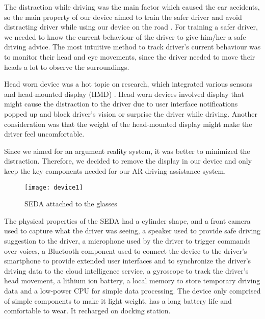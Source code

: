 \documentclass[main.tex]{subfiles}
\begin{document}

The distraction while driving was the main factor which caused the car accidents, so the main property of our device aimed to train the safer driver and avoid distracting driver while using our device on the road \cite{siebe2014distracted}. For training a safer driver, we needed to know the current behaviour of the driver to give him/her a safe driving advice. The most intuitive method to track driver’s current behaviour was to monitor their head and eye movements, since the driver needed to move their heads a lot to observe the surroundings.

Head worn device was a hot topic on research, which integrated various sensors and head-mounted display (HMD) \cite{van2010survey}. Head worn devices involved display that might cause the distraction to the driver due to user interface notifications popped up and block driver’s vision or surprise the driver while driving. Another consideration was that the weight of the head-mounted display might make the driver feel uncomfortable. 

Since we aimed for an argument reality system, it was better to minimized the distraction. Therefore, we decided to remove the display in our device and only keep the key components needed for our AR driving assistance system.

\begin{figure}
\caption{SEDA attached to the glasses}
\centering
\texttt{[image: device1]}
\end{figure}

The physical properties of the SEDA had a cylinder shape, and a front camera used to capture what the driver was seeing, a speaker used to provide safe driving suggestion to the driver, a microphone used by the driver to trigger commands over voices, a Bluetooth component used to connect the device to the driver’s smartphone to provide extended user interfaces and to synchronize the driver’s driving data to the cloud intelligence service, a gyroscope to track the driver’s head movement, a lithium ion battery, a local memory to store temporary driving data and a low-power CPU for simple data processing. The device only comprised of simple components to make it light weight, has a long battery life and comfortable to wear. It recharged on docking station.
\end{document}
